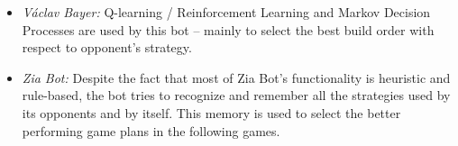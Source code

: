 \begin{itemize}
  \item {\em V\'{a}clav Bayer:} Q-learning / Reinforcement Learning and Markov Decision Processes are used by this bot -- mainly to select the best build order with respect to opponent's strategy.
  
  \item {\em Zia Bot:} Despite the fact that most of Zia Bot's functionality is heuristic and rule-based, the bot tries to recognize and remember all the strategies used by its opponents and by itself. This memory is used to select the better performing game plans in the following games.

\end{itemize}

